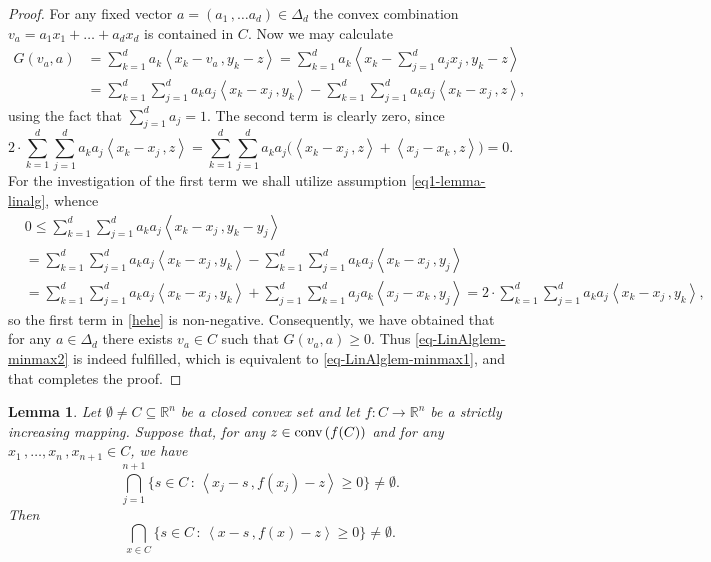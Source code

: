 \documentclass[12pt]{amsart}
\newtheorem{lemm}{Lemma}%
\theoremstyle{remark}
\theoremstyle{definition}
\newcommand{\Rn}{\mathbb{R}^n}
\newcommand{\conv}{\mbox{\rm conv}}
\newcommand{\map}{\longrightarrow}
\newcommand{\bsz}[2]{\left \langle #1 \,, #2 \right \rangle}
\begin{document}
\begin{proof}
For any fixed vector 
$ a = \left( a_1 \,, \dots a_d \right) \in \Delta_d $ 
the convex combination 
$ v_a = a_1 x_1 + \dots + a_d x_d $ is contained in $ C $. 
Now we may calculate 
\begin{align}
G(v_a,a) & = 
\sum_{k=1}^d a_k \bsz{x_k-v_a}{y_k-z} = 
\sum_{k=1}^d a_k \bsz{x_k- \sum_{j=1}^d a_j x_j}{y_k-z} \\ 
\label{hehe}
& = \sum_{k=1}^d \sum_{j=1}^d a_k a_j \bsz{x_k-x_j}{y_k} 
- \sum_{k=1}^d \sum_{j=1}^d a_k a_j \bsz{x_k-x_j}{z}, 
\end{align}
using the fact that $ \sum_{j=1}^d a_j = 1 $. 
The second term is clearly zero, since 
\[
2 \cdot \sum_{k=1}^d \sum_{j=1}^d a_k a_j \bsz{x_k-x_j}{z} 
= \sum_{k=1}^d \sum_{j=1}^d a_k a_j 
\bigl( \bsz{x_k-x_j}{z} + \bsz{x_j-x_k}{z} \bigr) = 0.  
\]
For the investigation of the first term we shall utilize 
assumption \eqref{eq1-lemma-linalg}, whence 
\begin{align*}
& 0 \leq 
\sum_{k=1}^d \sum_{j=1}^d a_k a_j \bsz{x_k-x_j}{y_k-y_j} \\ 
& = \sum_{k=1}^d \sum_{j=1}^d a_k a_j \bsz{x_k-x_j}{y_k} 
- \sum_{k=1}^d \sum_{j=1}^d a_k a_j \bsz{x_k-x_j}{y_j} \\ 
& = \sum_{k=1}^d \sum_{j=1}^d a_k a_j \bsz{x_k-x_j}{y_k} 
+ \sum_{j=1}^d \sum_{k=1}^d a_j a_k \bsz{x_j-x_k}{y_j} 
= 2 \cdot \sum_{k=1}^d \sum_{j=1}^d a_k a_j \bsz{x_k-x_j}{y_k},  
\end{align*} 
so the first term in \eqref{hehe} is non-negative. 
Consequently, we have obtained that for any $ a \in \Delta_d $ 
there exists $ v_a \in C $ such that $ G(v_a, a) \geq 0 $. 
Thus \eqref{eq-LinAlglem-minmax2} is indeed fulfilled, 
which is equivalent to \eqref{eq-LinAlglem-minmax1}, 
and that completes the proof. 
\end{proof}

\begin{lemm}\label{lemm-Intersection_nmpty}
Let $ \emptyset \neq C \subseteq \Rn $ be a closed convex set 
and let $ f : C \map \Rn $ be a strictly increasing mapping. 
Suppose that, for any $ z \in \conv \left( f(C) \right) $ 
and for any $ x_1 \,, \dots , x_n\,, x_{n+1} \in C $, 
we have 
\begin{equation}\label{eq-prop_HellyCond} 
\bigcap_{j=1}^{n+1} 
\lbrace s \in C \, : \, 
\bsz{x_j-s}{f(x_j)-z} \geq 0 
\rbrace \neq \emptyset. 
\end{equation}
Then 
\[
\bigcap_{x \in C} 
\lbrace s \in C \, : \, 
\bsz{x-s}{f(x)-z} \geq 0 
\rbrace \neq \emptyset. 
\]
\end{lemm}
\end{document}
